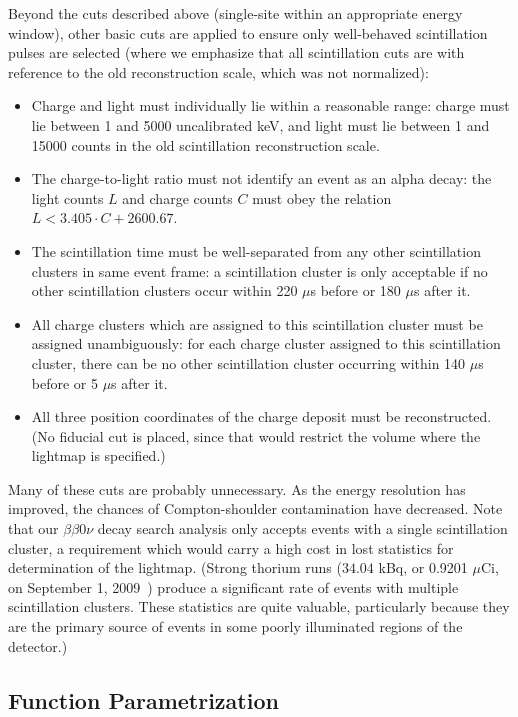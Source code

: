 Beyond the cuts described above (single-site within an appropriate energy window), other basic cuts are applied to ensure only well-behaved scintillation pulses are selected (where we emphasize that all scintillation cuts are with reference to the old reconstruction scale, which was not normalized):
\begin{itemize}
\item Charge and light must individually lie within a reasonable range: charge must lie between 1 and 5000 uncalibrated keV, and light must lie between 1 and 15000 counts in the old scintillation reconstruction scale.
\item The charge-to-light ratio must not identify an event as an alpha decay: the light counts $L$ and charge counts $C$ must obey the relation $L < 3.405\cdot C + 2600.67$.
\item The scintillation time must be well-separated from any other scintillation clusters in same event frame: a scintillation cluster is only acceptable if no other scintillation clusters occur within 220 $\mu$s before or 180 $\mu$s after it.
\item All charge clusters which are assigned to this scintillation cluster must be assigned unambiguously: for each charge cluster assigned to this scintillation cluster, there can be no other scintillation cluster occurring within 140 $\mu$s before or 5 $\mu$s after it.
\item All three position coordinates of the charge deposit must be reconstructed.  (No fiducial cut is placed, since that would restrict the volume where the lightmap is specified.)
\end{itemize}
Many of these cuts are probably unnecessary. As the energy resolution has improved, the chances of Compton-shoulder contamination have decreased. Note that our $\beta\beta 0\nu$ decay search analysis only accepts events with a single scintillation cluster, a requirement which would carry a high cost in lost statistics for determination of the lightmap.  (Strong thorium runs ($34.04$ kBq, or 0.9201 $\mu$Ci, on September 1, 2009~\cite{SourceCertificates}) produce a significant rate of events with multiple scintillation clusters.  These statistics are quite valuable, particularly because they are the primary source of events in some poorly illuminated regions of the detector.)  

\subsection{Function Parametrization} \label{sec:LightmapFunctionParametrization}

